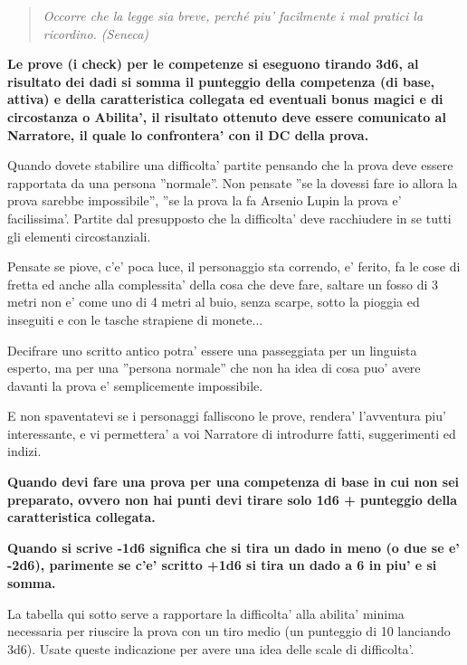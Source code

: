 \documentclass[a4paper,11pt,twoside,openany]{book}
\begin{document}
	\label{regole-per-le-competenze}
	\begin{quote}\textit{
			Occorre che la legge sia breve, perché piu' facilmente i mal pratici la ricordino. (Seneca)
	}\end{quote}
	
	\textbf{Le prove (i check) per le competenze si eseguono tirando 3d6, al risultato dei dadi si somma il punteggio della competenza (di base, attiva) e della caratteristica collegata ed eventuali bonus magici e di circostanza o Abilita', il risultato ottenuto deve essere comunicato al Narratore, il quale lo confrontera' con il DC della prova.}
	
	Quando dovete stabilire una difficolta' partite pensando che la prova deve essere rapportata da una persona ''normale''. Non pensate ''se la dovessi fare io allora la prova sarebbe impossibile'', ''se la prova la fa Arsenio Lupin la prova e' facilissima'. Partite dal presupposto che la difficolta' deve racchiudere in se tutti gli elementi circostanziali.
	
	Pensate se piove, c'e' poca luce, il personaggio sta correndo, e' ferito, fa le cose di fretta ed anche alla complessita' della cosa che deve fare, saltare un fosso di 3 metri non e' come uno di 4 metri al buio, senza scarpe, sotto la pioggia ed inseguiti e con le tasche strapiene di monete...
	
	Decifrare uno scritto antico potra' essere una passeggiata per un linguista esperto, ma per una ''persona normale'' che non ha idea di cosa puo' avere davanti la prova e' semplicemente impossibile.
	
	E non spaventatevi se i personaggi falliscono le prove, rendera' l'avventura piu' interessante, e vi permettera' a voi Narratore di introdurre fatti, suggerimenti ed indizi.
	
	\bigskip
	
	\textbf{Quando devi fare una prova per una competenza di base in cui non sei preparato, ovvero non hai punti devi tirare solo 1d6 + punteggio della caratteristica collegata.}
	
	\textbf{Quando si scrive -1d6 significa che si tira un dado in meno (o due se e' -2d6), parimente se c'e' scritto +1d6 si tira un dado a 6 in piu' e si somma.}
	
	\bigskip
	
	La tabella qui sotto serve a rapportare la difficolta' alla abilita' minima necessaria per riuscire la prova con un tiro medio (un punteggio di 10 lanciando 3d6). Usate queste indicazione per avere una idea delle scale di difficolta'.
	
\end{document}
